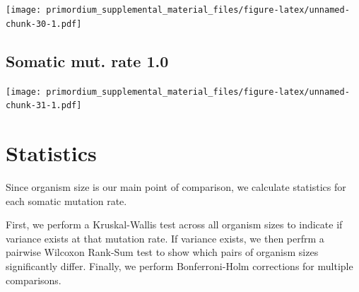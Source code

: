 \documentclass[]{book}
\begin{document}
\texttt{[image: primordium\_supplemental\_material\_files/figure-latex/unnamed-chunk-30-1.pdf]}

\hypertarget{somatic-mut.-rate-1.0}{%
\subsection{Somatic mut. rate 1.0}\label{somatic-mut.-rate-1.0}}

\texttt{[image: primordium\_supplemental\_material\_files/figure-latex/unnamed-chunk-31-1.pdf]}

\hypertarget{statistics-1}{%
\section{Statistics}\label{statistics-1}}

Since organism size is our main point of comparison, we calculate statistics for each somatic mutation rate.

First, we perform a Kruskal-Wallis test across all organism sizes to indicate if variance exists at that mutation rate.
If variance exists, we then perfrm a pairwise Wilcoxon Rank-Sum test to show which pairs of organism sizes significantly differ.
Finally, we perform Bonferroni-Holm corrections for multiple comparisons.
\end{document}
